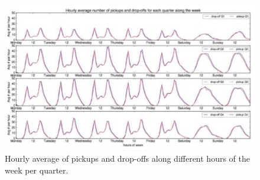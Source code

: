 \begin{figure}[h]
	\centering %
	\includegraphics[scale=0.35]{figs/hourly_bike.PNG}
	\caption{\footnotesize{Hourly average of pickups and drop-offs along different hours of the week per quarter. \cite{shafahi:2017:UVBSDB}}}
	\label{fig:Hour Chart}
	\captionsetup{justification=centering,margin=1cm}
	\vspace{-20pt}
\end{figure}
\newline